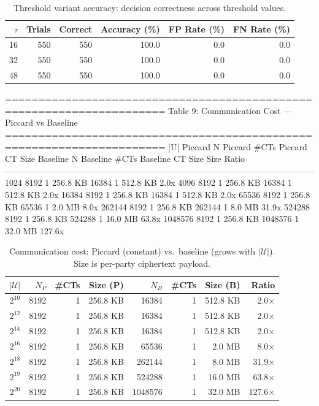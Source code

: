 \begin{table}[t]
\centering
\caption{Threshold variant accuracy: decision correctness across threshold values.}
\label{tab:threshold-accuracy}
\begin{tabular}{rrrrrr}
\toprule
$\tau$ & Trials & Correct & Accuracy (\%) & FP Rate (\%) & FN Rate (\%) \\
\midrule
16 & 550 & 550 & 100.0 & 0.0 & 0.0 \\
32 & 550 & 550 & 100.0 & 0.0 & 0.0 \\
48 & 550 & 550 & 100.0 & 0.0 & 0.0 \\
\bottomrule
\end{tabular}
\end{table}


======================================================================
  Table 9: Communication Cost — Piccard vs Baseline
======================================================================
      |U|  Piccard N  Piccard #CTs  Piccard CT Size  Baseline N  Baseline #CTs  Baseline CT Size  Size Ratio
------------------------------------------------------------------------------------------------------------
     1024       8192             1         256.8 KB       16384              1          512.8 KB        2.0x
     4096       8192             1         256.8 KB       16384              1          512.8 KB        2.0x
    16384       8192             1         256.8 KB       16384              1          512.8 KB        2.0x
    65536       8192             1         256.8 KB       65536              1            2.0 MB        8.0x
   262144       8192             1         256.8 KB      262144              1            8.0 MB       31.9x
   524288       8192             1         256.8 KB      524288              1           16.0 MB       63.8x
  1048576       8192             1         256.8 KB     1048576              1           32.0 MB      127.6x

\begin{table}[t]
\centering
\caption{Communication cost: Piccard (constant) vs.\ baseline (grows with $|\mathcal{U}|$). Size is per-party ciphertext payload.}
\label{tab:communication-cost}
\begin{tabular}{rrrrrrrr}
\toprule
$|\mathcal{U}|$ & $N_P$ & \#CTs & Size (P) & $N_B$ & \#CTs & Size (B) & Ratio \\
\midrule
$2^{10}$ & 8192 & 1 & 256.8 KB & 16384 & 1 & 512.8 KB & 2.0$\times$ \\
$2^{12}$ & 8192 & 1 & 256.8 KB & 16384 & 1 & 512.8 KB & 2.0$\times$ \\
$2^{14}$ & 8192 & 1 & 256.8 KB & 16384 & 1 & 512.8 KB & 2.0$\times$ \\
$2^{16}$ & 8192 & 1 & 256.8 KB & 65536 & 1 & 2.0 MB & 8.0$\times$ \\
$2^{18}$ & 8192 & 1 & 256.8 KB & 262144 & 1 & 8.0 MB & 31.9$\times$ \\
$2^{19}$ & 8192 & 1 & 256.8 KB & 524288 & 1 & 16.0 MB & 63.8$\times$ \\
$2^{20}$ & 8192 & 1 & 256.8 KB & 1048576 & 1 & 32.0 MB & 127.6$\times$ \\
\bottomrule
\end{tabular}
\end{table}


